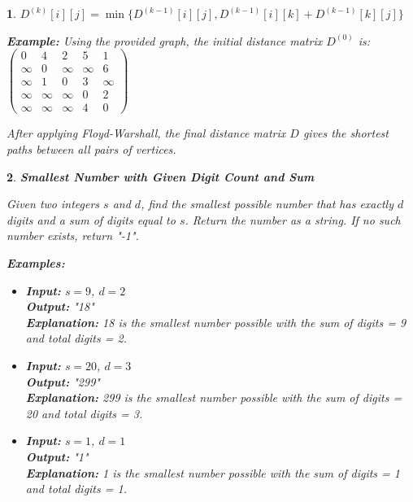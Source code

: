 \documentclass[%
addpoints]{exam}
\theoremstyle{problem}
\newtheorem{p}{}
\begin{document}
\begin{p}
$D^{(k)}[i][j] = \min\{D^{(k-1)}[i][j], D^{(k-1)}[i][k] + D^{(k-1)}[k][j]\}$

\textbf{Example:} Using the provided graph, the initial distance matrix $D^{(0)}$ is:
$\begin{pmatrix}
0 & 4 & 2 & 5 & 1 \\
\infty & 0 & \infty & \infty & 6 \\
\infty & 1 & 0 & 3 & \infty \\
\infty & \infty & \infty & 0 & 2 \\
\infty & \infty & \infty & 4 & 0
\end{pmatrix}$

After applying Floyd-Warshall, the final distance matrix $D$ gives the shortest paths between all pairs of vertices.
\hfill \end{p}


\begin{p}
\textbf{Smallest Number with Given Digit Count and Sum}

Given two integers $s$ and $d$, find the smallest possible number that has exactly $d$ digits and a sum of digits equal to $s$. Return the number as a string. If no such number exists, return "-1".

\textbf{Examples:}
\begin{itemize}
\item \textbf{Input:} $s = 9$, $d = 2$\\
      \textbf{Output:} "18"\\
      \textbf{Explanation:} 18 is the smallest number possible with the sum of digits = 9 and total digits = 2.
      
\item \textbf{Input:} $s = 20$, $d = 3$\\
      \textbf{Output:} "299"\\
      \textbf{Explanation:} 299 is the smallest number possible with the sum of digits = 20 and total digits = 3.
      
\item \textbf{Input:} $s = 1$, $d = 1$\\
      \textbf{Output:} "1"\\
      \textbf{Explanation:} 1 is the smallest number possible with the sum of digits = 1 and total digits = 1.
\end{itemize}
\hfill \end{p}
\end{document}
